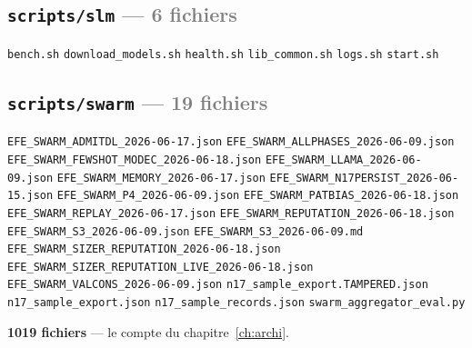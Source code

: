 \documentclass[10pt]{report}
\newcommand{\code}[1]{\texttt{\small #1}}
\begin{document}
\subsection*{\code{scripts/slm} \normalfont\textcolor{grey}{--- 6 fichiers}}
\begin{sloppypar}\footnotesize\raggedright
\code{bench.sh} \;\textbullet\; \code{download\_models.sh} \;\textbullet\; \code{health.sh} \;\textbullet\; \code{lib\_common.sh} \;\textbullet\; \code{logs.sh} \;\textbullet\; \code{start.sh}
\end{sloppypar}

\subsection*{\code{scripts/swarm} \normalfont\textcolor{grey}{--- 19 fichiers}}
\begin{sloppypar}\footnotesize\raggedright
\code{EFE\_SWARM\_ADMITDL\_2026-06-17.json} \;\textbullet\; \code{EFE\_SWARM\_ALLPHASES\_2026-06-09.json} \;\textbullet\; \code{EFE\_SWARM\_FEWSHOT\_MODEC\_2026-06-18.json} \;\textbullet\; \code{EFE\_SWARM\_LLAMA\_2026-06-09.json} \;\textbullet\; \code{EFE\_SWARM\_MEMORY\_2026-06-17.json} \;\textbullet\; \code{EFE\_SWARM\_N17PERSIST\_2026-06-15.json} \;\textbullet\; \code{EFE\_SWARM\_P4\_2026-06-09.json} \;\textbullet\; \code{EFE\_SWARM\_PATBIAS\_2026-06-18.json} \;\textbullet\; \code{EFE\_SWARM\_REPLAY\_2026-06-17.json} \;\textbullet\; \code{EFE\_SWARM\_REPUTATION\_2026-06-18.json} \;\textbullet\; \code{EFE\_SWARM\_S3\_2026-06-09.json} \;\textbullet\; \code{EFE\_SWARM\_S3\_2026-06-09.md} \;\textbullet\; \code{EFE\_SWARM\_SIZER\_REPUTATION\_2026-06-18.json} \;\textbullet\; \code{EFE\_SWARM\_SIZER\_REPUTATION\_LIVE\_2026-06-18.json} \;\textbullet\; \code{EFE\_SWARM\_VALCONS\_2026-06-09.json} \;\textbullet\; \code{n17\_sample\_export.TAMPERED.json} \;\textbullet\; \code{n17\_sample\_export.json} \;\textbullet\; \code{n17\_sample\_records.json} \;\textbullet\; \code{swarm\_aggregator\_eval.py}
\end{sloppypar}

\bigskip\begin{acquis}\centering \textbf{1019 fichiers} --- le compte du chapitre~\ref{ch:archi}.\end{acquis}
\end{document}
